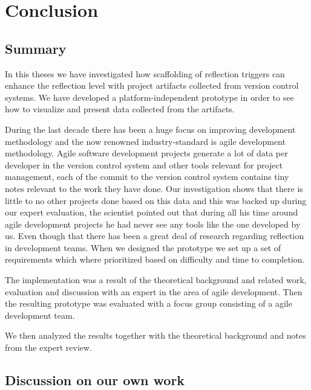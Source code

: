 \chapter{Conclusion}
 
\section{Summary}
In this theses we have investigated how scaffolding of reflection triggers can enhance the reflection level with project artifacts collected from version control systems. We have developed a platform-independent prototype in order to see how to visualize and present data collected from the artifacts.

During the last decade there has been a huge focus on improving development methodology and the now renowned industry-standard is agile development methodology. Agile software development projects generate a lot of data per developer in the version control system and other tools relevant for project management, each of the commit to the version control system contains tiny notes relevant to the work they have done. Our investigation shows that there is little to no other projects done based on this data and this was backed up during our expert evaluation, the scientist pointed out that during all his time around agile development projects he had never see any tools like the one developed by us. Even though that there has been a great deal of research regarding reflection in development teams. When we designed the prototype we set up a set of requirements which where prioritized based on difficulty and time to completion.

The implementation was a result of the theoretical background and related work, evaluation and discussion with an expert in the area of agile development. Then the resulting prototype was evaluated with a focus group consisting of a agile development team.

We then analyzed the results together with the theoretical background and notes from the expert review.

\section{Discussion on our own work}

